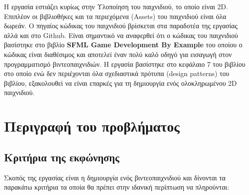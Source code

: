 \documentclass[12pt]{article}
\begin{document}
	Η εργασία εστιάζει κυρίως στην Υλοποίηση του παιχνιδιού, το οποίο είναι 2D. Επιπλέον οι βιβλιοθήκες και τα περιεχόμενα (Assets) του παιχνιδιού είναι όλα δωρεάν. Ο πηγαίος κώδικας του παιχνιδιού βρίσκεται στα παραδοτέα της εργασίας αλλά και στο Github. Είναι σημαντικό να αναφερθεί ότι ο κώδικας του παιχνιδιού βασίστηκε στο βιβλίο \textbf{SFML Game Development By Example} του οποίου ο κώδικας είναι διαθέσιμος και αποτελεί έναν πολύ καλό οδηγό για εισαγωγή στον προγραμματισμό βιντεοπαιχνιδιών. Η εργασία βασίστηκε στο κεφάλαιο 7 του βιβλίου στο οποίο ενώ δεν περιέχονται όλα σχεδιαστικά πρότυπα (design patterns) του βιβλίου, εξακολουθεί να είναι επαρκές για τη δημιουργία ενός ολοκληρωμένου 2D παιχνιδιού.
	
	
	\newpage
	
	
	
	\section{Περιγραφή του προβλήματος}
	
	\subsection{Κριτήρια της εκφώνησης}
	
	Σκοπός της εργασίας είναι η δημιουργία ενός βιντεοπαιχνιδιού και δίνονται τα παρακάτω κριτήρια τα οποία θα πρέπει στην ιδανική περίπτωση να πληρούνται:
	
\end{document}
